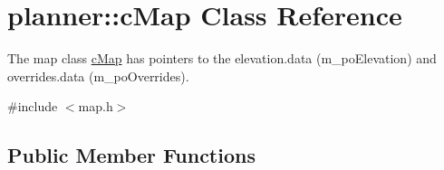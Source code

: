 \hypertarget{classplanner_1_1c_map}{}\section{planner\+:\+:c\+Map Class Reference}
\label{classplanner_1_1c_map}


The map class \mbox{\hyperlink{classplanner_1_1c_map}{c\+Map}} has pointers to the elevation.\+data (m\+\_\+po\+Elevation) and overrides.\+data (m\+\_\+po\+Overrides).  




{\ttfamily \#include $<$map.\+h$>$}

\subsection*{Public Member Functions}
